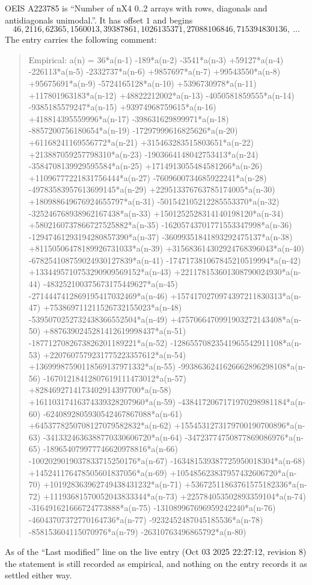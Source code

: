 \documentclass[11pt,a4paper]{article}
\theoremstyle{plain}
\theoremstyle{definition}
\begin{document}
OEIS A223785 is ``Number of nX4 0..2 arrays with rows, diagonals and antidiagonals unimodal.''. It has offset $1$ and begins
\[
46, 2116, 62365, 1560013, 39387861, 1026135371, 27088106846, 715394830136,\ \dots
\]
The entry carries the following comment:
\begin{quote}\small
Empirical: a(n) = 36*a(n-1) -189*a(n-2) -3541*a(n-3) +59127*a(n-4) -226113*a(n-5) -2332737*a(n-6) +9857697*a(n-7) +99543550*a(n-8) +95675691*a(n-9) -5724165128*a(n-10) +5396730978*a(n-11) +117801963183*a(n-12) +48822212002*a(n-13) -4050581859555*a(n-14) -9385185579247*a(n-15) +93974968759615*a(n-16) +418814395559996*a(n-17) -398631629899971*a(n-18) -8857200756180654*a(n-19) -17297999616825626*a(n-20) +61168241169556772*a(n-21) +315463283515803651*a(n-22) +213887059257798310*a(n-23) -1903664148042753413*a(n-24) -3584708139929595584*a(n-25) +1714913055484581266*a(n-26) +11096777221831756444*a(n-27) -7609600734685922241*a(n-28) -49783583957613699145*a(n-29) +229513376763785174005*a(n-30) +180988649676924655797*a(n-31) -501542105212285553370*a(n-32) -325246768938962167438*a(n-33) +1501252528314140198120*a(n-34) +5802160737866727525882*a(n-35) -16205743701771553347998*a(n-36) -12947461293194280857390*a(n-37) -36099351841893292475137*a(n-38) +81150506478189926731033*a(n-39) +315683614302924768396043*a(n-40) -678254108759024930127839*a(n-41) -174717381067845210519994*a(n-42) +1334495710753290909569152*a(n-43) +221178153601308790024930*a(n-44) -483252100375673175449627*a(n-45) -2714447412869195417032469*a(n-46) +1574170270974397211830313*a(n-47) +753869711211526732155023*a(n-48) -5395070252732438366552504*a(n-49) +4757066470991903272143408*a(n-50) +8876390245281412619998437*a(n-51) -1877127082673826201189221*a(n-52) -12865570823541965542911108*a(n-53) +2207607579231775223357612*a(n-54) +13699987590118569137971332*a(n-55) -9938636241626662896298108*a(n-56) -16701218412807619111473012*a(n-57) +8284692714173402914397700*a(n-58) +16110317416374339328207960*a(n-59) -4384172067171970298981184*a(n-60) -6240892805930542467867088*a(n-61) +6453778250708127079582832*a(n-62) +1554531273179700190700896*a(n-63) -3413324636388770330606720*a(n-64) -34723774750877869086976*a(n-65) -189654079977746620978816*a(n-66) -1002029019037833715250176*a(n-67) -163481539387725950018304*a(n-68) +145241176478505601837056*a(n-69) +105485623837957432606720*a(n-70) +101928363962749438431232*a(n-71) +53672511863761575182336*a(n-72) +11193681570052043833344*a(n-73) +225784053502893359104*a(n-74) -316491621666724773888*a(n-75) -131089967696959242240*a(n-76) -46043707372770164736*a(n-77) -9232452487045185536*a(n-78) -858153604115070976*a(n-79) -26310763496865792*a(n-80)
\end{quote}
As of the ``Last modified'' line on the live entry (Oct 03 2025 22:27:12, revision 8) the statement is
still recorded as empirical, and nothing on the entry records it as settled either way.
\end{document}
